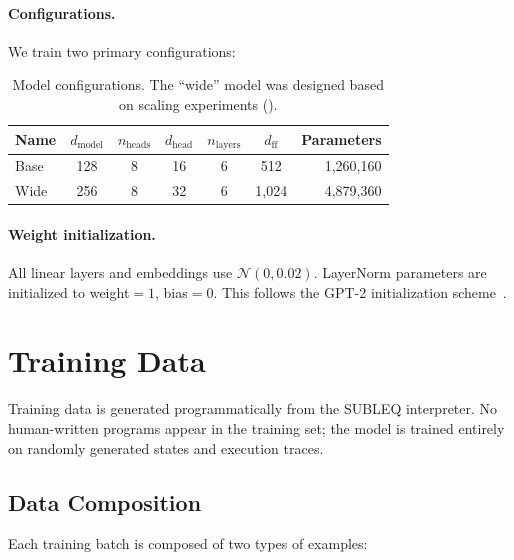 \documentclass[11pt,a4paper]{article}
\begin{document}
\paragraph{Configurations.}
We train two primary configurations:

\begin{table}[h]
\centering
\caption{Model configurations. The ``wide'' model was designed based on scaling experiments ().}
\label{tab:models}
\begin{tabular}{lcccccr}
\toprule
\textbf{Name} & $d_\text{model}$ & $n_\text{heads}$ & $d_\text{head}$ & $n_\text{layers}$ & $d_\text{ff}$ & \textbf{Parameters} \\
\midrule
Base & 128 & 8 & 16 & 6 & 512 & 1{,}260{,}160 \\
Wide & 256 & 8 & 32 & 6 & 1{,}024 & 4{,}879{,}360 \\
\bottomrule
\end{tabular}
\end{table}

\paragraph{Weight initialization.}
All linear layers and embeddings use $\mathcal{N}(0, 0.02)$.
LayerNorm parameters are initialized to weight${}=1$, bias${}=0$.
This follows the GPT-2 initialization scheme~\cite{radford2019gpt2}.

\section{Training Data}
\label{sec:data}

Training data is generated programmatically from the SUBLEQ interpreter.
No human-written programs appear in the training set; the model is trained entirely on randomly generated states and execution traces.

\subsection{Data Composition}

Each training batch is composed of two types of examples:
\end{document}
